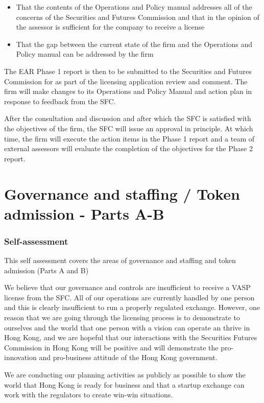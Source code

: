 \documentclass[]{report}
\begin{document}
\begin{itemize}
  \item That the contents of the Operations and Policy manual
    addresses all of the concerns of the Securities and Futures
    Commission and that in the opinion of the assessor is sufficient
    for the company to receive a license
  \item That the gap between the current state of the firm and the
    Operations and Policy manual can be addressed by the firm
\end{itemize}

The EAR Phase 1 report is then to be submitted to the Securities and
Futures Commission for as part of the licensing application review and
comment.  The firm will make changes to its Operations and Policy
Manual and action plan in response to feedback from the SFC.

After the consultation and discussion and after which the SFC is
satisfied with the objectives of the firm, the SFC will issue an
approval in principle.  At which time, the firm will execute the
action items in the Phase 1 report and a team of external assessors
will evaluate the completion of the objectives for the Phase 2 report.

\chapter{Governance and staffing / Token admission - Parts A-B}
\subsection{Self-assessment}
This self assessment covers the areas of governance and staffing and
token admission (Parts A and B)

We believe that our governance and controls are insufficient
to receive a VASP license from the SFC.  All of our operations are
currently handled by one person and this is clearly insufficient to
run a properly regulated exchange.  However, one reason that we are
going through the licensing process is to demonstrate to ourselves and
the world that one person with a vision can operate an thrive in Hong
Kong, and we are hopeful that our interactions with the Securities
Futures Commission in Hong Kong will be positive and will demonstrate
the pro-innovation and pro-business attitude of the Hong Kong
government.

We are conducting our planning activities as publicly as possible to
show the world that Hong Kong is ready for business and that a startup
exchange can work with the regulators to create win-win situations.
\end{document}
